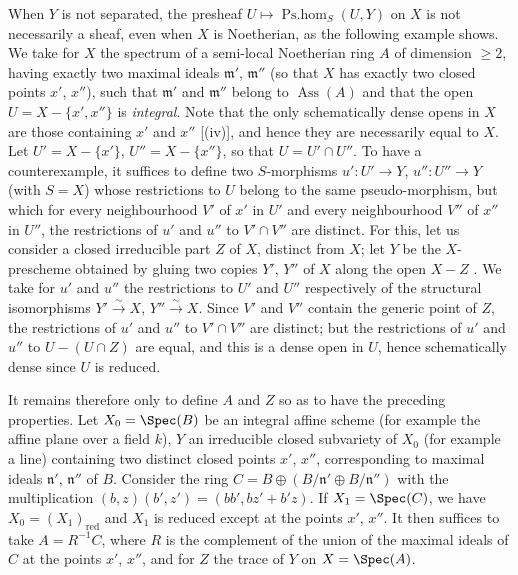 \begin{remark}[20.2.16]
\label{IV.20.2.16}
When $Y$ is not separated, the presheaf $U\mapsto\operatorname{Ps.hom}_S(U,Y)$ on $X$ is not necessarily a sheaf, even when $X$ is Noetherian, as the following example shows.
We take for $X$ the spectrum of a semi-local Noetherian ring $A$ of dimension $\geq 2$, having exactly two
maximal ideals $\mathfrak{m}'$, $\mathfrak{m}''$ (so that $X$ has exactly two closed points $x'$, $x''$), such that $\mathfrak{m}'$ and $\mathfrak{m}''$ belong to $\operatorname{Ass}(A)$ and that the open $U=X-\{x',x''\}$ is \emph{integral}.
Note that the only schematically dense opens in $X$ are those containing $x'$ and $x''$ [(iv)], and hence they are necessarily equal to $X$.
Let $U'=X-\{x'\}$, $U''=X-\{x''\}$, so that $U=U'\cap U''$.
To have a counterexample, it suffices to define two $S$-morphisms $u':U'\to Y$, $u'':U''\to Y$ (with $S=X$) whose restrictions to $U$ belong to the same pseudo-morphism, but which for every neighbourhood $V'$ of $x'$ in $U'$ and every neighbourhood $V''$ of $x''$ in $U''$, the restrictions of $u'$ and $u''$ to $V'\cap V''$ are distinct.
For this, let us consider a closed irreducible part $Z$ of $X$, distinct from $X$;
let $Y$ be the $X$-prescheme obtained by gluing two copies $Y'$, $Y''$ of $X$ along the open $X-Z$ .
We take for $u'$ and $u''$ the restrictions to $U'$ and $U''$ respectively of the structural isomorphisms $Y'\xrightarrow{\sim}X$, $Y''\xrightarrow{\sim}X$.
Since $V'$ and $V''$ contain the generic point of $Z$, the restrictions of $u'$ and $u''$ to $V'\cap V''$ are distinct; but the restrictions of $u'$ and $u''$ to $U-(U\cap Z)$ are equal, and this is a dense open in $U$, hence schematically dense since $U$ is reduced.

It remains therefore only to define $A$ and $Z$ so as to have the preceding properties.
Let $X_0=\Spec(B)$ be an integral affine scheme (for example the affine plane over a field $k$), $Y$ an irreducible closed subvariety of $X_0$ (for example a line) containing two distinct closed points $x'$, $x''$, corresponding to maximal ideals $\mathfrak{n}'$, $\mathfrak{n}''$ of $B$.
Consider the ring $C=B\oplus(B/\mathfrak{n}'\oplus B/\mathfrak{n}'')$ with the multiplication $(b,z)(b',z')=(bb',bz'+b'z)$.
If $X_1=\Spec(C)$, we have $X_0=(X_1)_\mathrm{red}$ and $X_1$ is reduced except at the points $x'$, $x''$.
It then suffices to take $A=R^{-1}C$, where $R$ is the complement of the union of the maximal ideals of $C$ at the points $x'$, $x''$, and for $Z$ the trace of $Y$ on $X=\Spec(A)$.
\end{remark}

